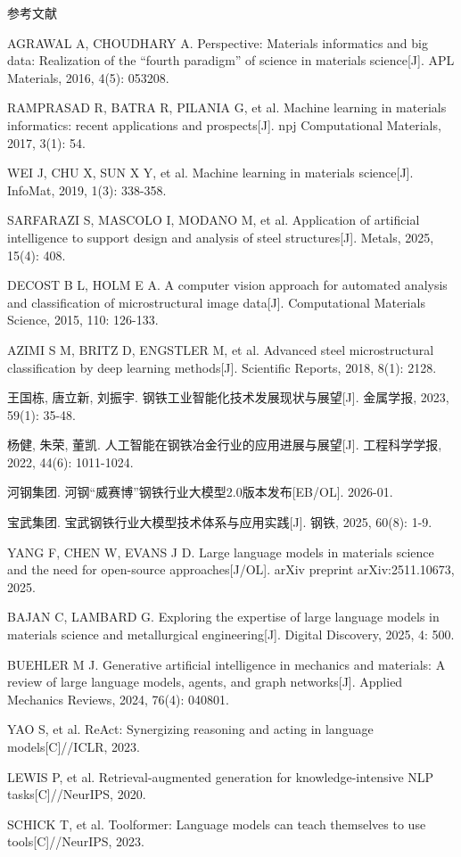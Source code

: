 \documentclass[a4paper, 12pt]{ctexart}
\begin{document}
\vspace{3ex}

\begin{center}
    {\heiti{} 参考文献}
\end{center}

{\songti{}
\noindent [1] AGRAWAL A, CHOUDHARY A. Perspective: Materials informatics and big data: Realization of the ``fourth paradigm'' of science in materials science[J]. APL Materials, 2016, 4(5): 053208.

\noindent [2] RAMPRASAD R, BATRA R, PILANIA G, et al. Machine learning in materials informatics: recent applications and prospects[J]. npj Computational Materials, 2017, 3(1): 54.

\noindent [3] WEI J, CHU X, SUN X Y, et al. Machine learning in materials science[J]. InfoMat, 2019, 1(3): 338-358.

\noindent [4] SARFARAZI S, MASCOLO I, MODANO M, et al. Application of artificial intelligence to support design and analysis of steel structures[J]. Metals, 2025, 15(4): 408.

\noindent [5] DECOST B L, HOLM E A. A computer vision approach for automated analysis and classification of microstructural image data[J]. Computational Materials Science, 2015, 110: 126-133.

\noindent [6] AZIMI S M, BRITZ D, ENGSTLER M, et al. Advanced steel microstructural classification by deep learning methods[J]. Scientific Reports, 2018, 8(1): 2128.

\noindent [7] 王国栋, 唐立新, 刘振宇. 钢铁工业智能化技术发展现状与展望[J]. 金属学报, 2023, 59(1): 35-48.

\noindent [8] 杨健, 朱荣, 董凯. 人工智能在钢铁冶金行业的应用进展与展望[J]. 工程科学学报, 2022, 44(6): 1011-1024.

\noindent [9] 河钢集团. 河钢“威赛博”钢铁行业大模型2.0版本发布[EB/OL]. 2026-01.

\noindent [10] 宝武集团. 宝武钢铁行业大模型技术体系与应用实践[J]. 钢铁, 2025, 60(8): 1-9.

\noindent [11] YANG F, CHEN W, EVANS J D. Large language models in materials science and the need for open-source approaches[J/OL]. arXiv preprint arXiv:2511.10673, 2025.

\noindent [12] BAJAN C, LAMBARD G. Exploring the expertise of large language models in materials science and metallurgical engineering[J]. Digital Discovery, 2025, 4: 500.

\noindent [13] BUEHLER M J. Generative artificial intelligence in mechanics and materials: A review of large language models, agents, and graph networks[J]. Applied Mechanics Reviews, 2024, 76(4): 040801.

\noindent [14] YAO S, et al. ReAct: Synergizing reasoning and acting in language models[C]//ICLR, 2023.

\noindent [15] LEWIS P, et al. Retrieval-augmented generation for knowledge-intensive NLP tasks[C]//NeurIPS, 2020.

\noindent [16] SCHICK T, et al. Toolformer: Language models can teach themselves to use tools[C]//NeurIPS, 2023.
}
\end{document}
